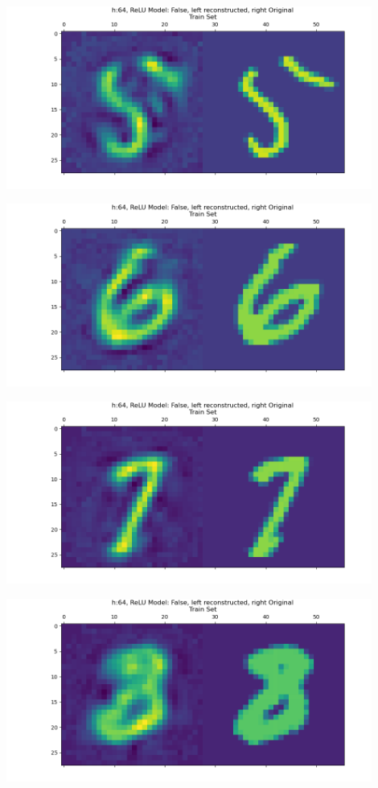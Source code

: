 \documentclass[]{article}
\begin{document}
        \begin{center}
            \includegraphics*[width=12cm]{A4plots/06-43-18-h-64-lin-digit-5.png}
        \end{center}
        \begin{center}
            \includegraphics*[width=12cm]{A4plots/06-43-19-h-64-lin-digit-6.png}
        \end{center}
        \begin{center}
            \includegraphics*[width=12cm]{A4plots/06-43-19-h-64-lin-digit-7.png}
        \end{center}
        \begin{center}
            \includegraphics*[width=12cm]{A4plots/06-43-19-h-64-lin-digit-8.png}
        \end{center}
\end{document}
